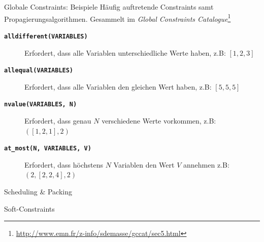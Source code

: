 \documentclass[10pt,xcolor={dvipsnames},fleqn]{beamer}
\begin{document}
\begin{frame}[fragile]{Globale Constraints: Beispiele}
Häufig auftretende Constraints samt Propagierungsalgorithmen. Gesammelt im \emph{Global Constraints Catalogue}\footnote{\url{http://www.emn.fr/z-info/sdemasse/gccat/sec5.html}}

\vspace*{2ex}

\begin{description}
\item[{\tt \textbf{alldifferent(VARIABLES)}}] Erfordert, dass alle Variablen \alert{unterschiedliche} Werte haben, z.B: $[1,2,3]$ \pause

\item[{\tt \textbf{allequal(VARIABLES)}}] Erfordert, dass alle Variablen den \alert{gleichen} Wert haben, z.B: $[5,5,5]$ \pause

\item[{\tt \textbf{nvalue(VARIABLES, N)}}] Erfordert, dass genau $N$ verschiedene Werte vorkommen, z.B: $([1,2,1],2)$ \pause

\item[{\tt \textbf{at\_most(N, VARIABLES, V)}}] Erfordert, dass höchstens $N$ Variablen den Wert $V$ annehmen z.B: $(2,[2,2,4],2)$


\end{description}
\end{frame}

\begin{frame}{Scheduling \& Packing}

\end{frame}

\begin{frame}{Soft-Constraints}

\end{frame}
\end{document}
